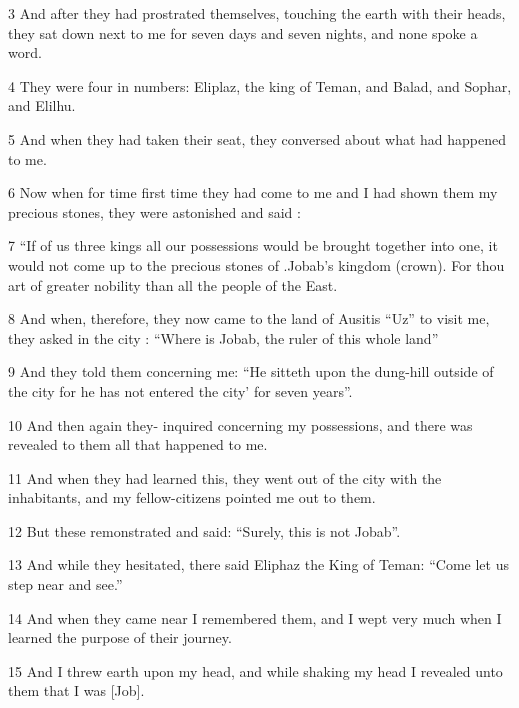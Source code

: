 \par 3 And after they had prostrated themselves, touching the earth with their heads, they sat down next to me for seven days and seven nights, and none spoke a word.

\par 4 They were four in numbers: Eliplaz, the king of Teman, and Balad, and Sophar, and Elilhu.

\par 5 And when they had taken their seat, they conversed about what had happened to me.

\par 6 Now when for time first time they had come to me and I had shown them my precious stones, they were astonished and said :

\par 7 “If of us three kings all our possessions would be brought together into one, it would not come up to the precious stones of .Jobab’s kingdom (crown). For thou art of greater nobility than all the people of the East.

\par 8 And when, therefore, they now came to the land of Ausitis “Uz” to visit me, they asked in the city : “Where is Jobab, the ruler of this whole land”

\par 9 And they told them concerning me: “He sitteth upon the dung-hill outside of the city for he has not entered the city’ for seven years”.

\par 10 And then again they- inquired concerning my possessions, and there was revealed to them all that happened to me.

\par 11 And when they had learned this, they went out of the city with the inhabitants, and my fellow-citizens pointed me out to them.

\par 12 But these remonstrated and said: “Surely, this is not Jobab”.

\par 13 And while they hesitated, there said Eliphaz the King of Teman: “Come let us step near and see.”

\par 14 And when they came near I remembered them, and I wept very much when I learned the purpose of their journey.

\par 15 And I threw earth upon my head, and while shaking my head I revealed unto them that I was [Job].

